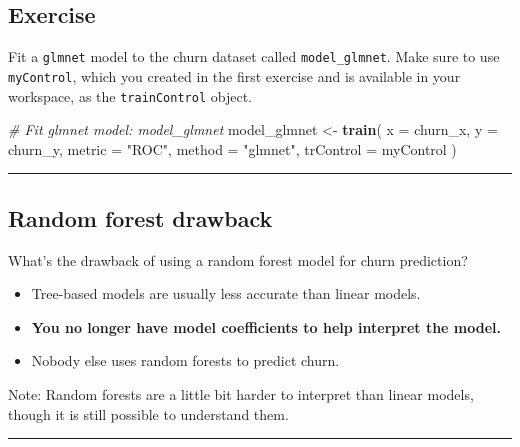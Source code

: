 \documentclass[]{book}
\newenvironment{Shaded}{\begin{snugshade}}{\end{snugshade}}
\newcommand{\KeywordTok}[1]{\textcolor[rgb]{0.13,0.29,0.53}{\textbf{#1}}}
\newcommand{\DataTypeTok}[1]{\textcolor[rgb]{0.13,0.29,0.53}{#1}}
\newcommand{\StringTok}[1]{\textcolor[rgb]{0.31,0.60,0.02}{#1}}
\newcommand{\CommentTok}[1]{\textcolor[rgb]{0.56,0.35,0.01}{\textit{#1}}}
\newcommand{\NormalTok}[1]{#1}
\begin{document}
\subsection*{Exercise}\label{exercise-30}

Fit a \texttt{glmnet} model to the churn dataset called
\texttt{model\_glmnet}. Make sure to use \texttt{myControl}, which you
created in the first exercise and is available in your workspace, as the
\texttt{trainControl} object.

\begin{Shaded}
\begin{Highlighting}[]
\CommentTok{# Fit glmnet model: model_glmnet}
\NormalTok{model_glmnet <-}\StringTok{ }\KeywordTok{train}\NormalTok{(}
  \DataTypeTok{x =}\NormalTok{ churn_x, }\DataTypeTok{y =}\NormalTok{ churn_y,}
  \DataTypeTok{metric =} \StringTok{"ROC"}\NormalTok{,}
  \DataTypeTok{method =} \StringTok{"glmnet"}\NormalTok{,}
  \DataTypeTok{trControl =}\NormalTok{ myControl}
\NormalTok{)}
\end{Highlighting}
\end{Shaded}

\begin{center}\rule{0.5\linewidth}{\linethickness}\end{center}

\subsection*{Random forest drawback}\label{random-forest-drawback}

What's the drawback of using a random forest model for churn prediction?

\begin{itemize}
\item
  Tree-based models are usually less accurate than linear models.
\item
  \textbf{You no longer have model coefficients to help interpret the
  model.}
\item
  Nobody else uses random forests to predict churn.
\end{itemize}

Note: Random forests are a little bit harder to interpret than linear
models, though it is still possible to understand them.

\begin{center}\rule{0.5\linewidth}{\linethickness}\end{center}
\end{document}
